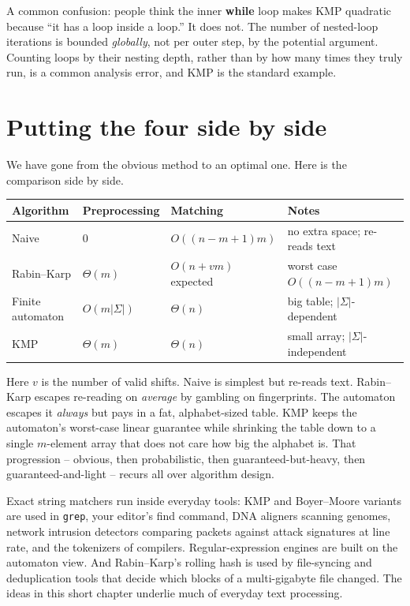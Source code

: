 \begin{trapbox}
A common confusion: people think the inner \textbf{while} loop makes KMP
quadratic because ``it has a loop inside a loop.'' It does not. The number of
nested-loop iterations is bounded \emph{globally}, not per outer step, by the
potential argument. Counting loops by their nesting depth, rather than by how
many times they truly run, is a common analysis error, and KMP is the standard
example.
\end{trapbox}

\section{Putting the four side by side}
\label{ch31:summary}

We have gone from the obvious method to an optimal one. Here is the comparison
side by side.

\begin{center}
\begin{tabular}{l l l l}
\toprule
Algorithm & Preprocessing & Matching & Notes \\
\midrule
Naive & $0$ & $O((n-m+1)m)$ & no extra space; re-reads text \\
Rabin--Karp & $\Theta(m)$ & $O(n+vm)$ expected & worst case $O((n-m+1)m)$ \\
Finite automaton & $O(m|\Sigma|)$ & $\Theta(n)$ & big table; $|\Sigma|$-dependent \\
KMP & $\Theta(m)$ & $\Theta(n)$ & small array; $|\Sigma|$-independent \\
\bottomrule
\end{tabular}
\end{center}

Here $v$ is the number of valid shifts. Naive is
simplest but re-reads text. Rabin--Karp escapes re-reading on \emph{average} by
gambling on fingerprints. The automaton escapes it \emph{always} but pays in a
fat, alphabet-sized table. KMP keeps the automaton's worst-case linear guarantee
while shrinking the table down to a single $m$-element array that does not care
how big the alphabet is. That progression -- obvious, then probabilistic, then
guaranteed-but-heavy, then guaranteed-and-light -- recurs all over algorithm
design.

\begin{aestheticbox}
Exact string matchers run inside everyday tools: KMP and Boyer--Moore variants
are used in \texttt{grep}, your editor's find command, DNA aligners scanning
genomes, network intrusion detectors comparing packets against attack signatures
at line rate, and the tokenizers of compilers. Regular-expression engines are
built on the automaton view. And Rabin--Karp's rolling hash is used by
file-syncing and deduplication tools that decide which blocks of a
multi-gigabyte file changed. The ideas in this short chapter underlie
much of everyday text processing.
\end{aestheticbox}

